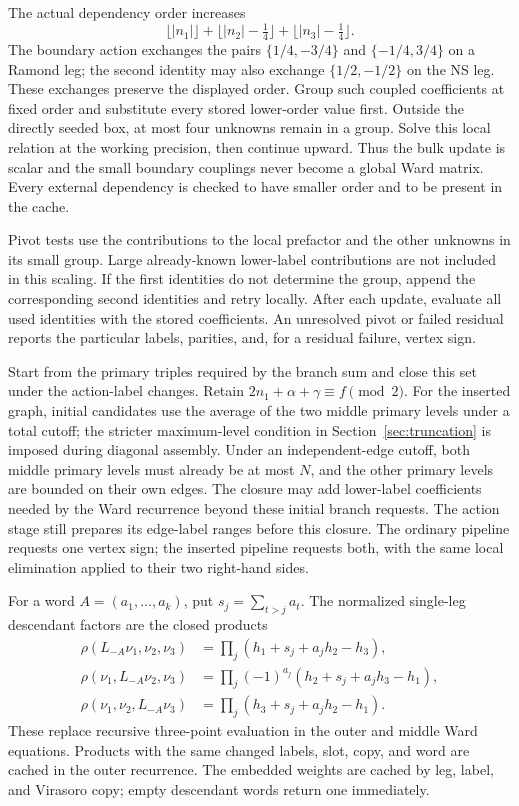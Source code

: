 \documentclass[11pt]{article}
\numberwithin{equation}{section}
\begin{document}
The actual dependency order increases
\begin{equation}
 \lfloor |n_1|\rfloor+\lfloor |n_2|-\tfrac14\rfloor
                         +\lfloor |n_3|-\tfrac14\rfloor.
\end{equation}
The boundary action exchanges the pairs $\{1/4,-3/4\}$ and
$\{-1/4,3/4\}$ on a Ramond leg; the second identity may also exchange
$\{1/2,-1/2\}$ on the NS leg. These exchanges preserve the displayed order.
Group such coupled coefficients at fixed order and substitute every stored
lower-order value first. Outside the directly seeded box, at most four
unknowns remain in a group. Solve this local relation at the working precision,
then continue upward. Thus the bulk update is scalar and the small boundary
couplings never become a global Ward matrix. Every external dependency is
checked to have smaller order and to be present in the cache.

Pivot tests use the contributions to the local prefactor and the other
unknowns in its small group. Large already-known lower-label contributions
are not included in this scaling. If the first identities do not determine
the group, append the corresponding second identities and retry locally.
After each update, evaluate all used identities with the stored coefficients.
An unresolved pivot or failed residual reports the particular labels, parities,
and, for a residual failure, vertex sign.

Start from the primary triples required by the branch sum and close this set
under the action-label changes. Retain
$2n_1+\alpha+\gamma\equiv f\pmod2$. For the inserted graph, initial candidates
use the average of the two middle primary levels under a total cutoff; the
stricter maximum-level condition in Section~\ref{sec:truncation} is imposed
during diagonal assembly. Under an independent-edge cutoff, both middle
primary levels must already be at most $N$, and the other primary levels
are bounded on their own edges. The closure may add lower-label coefficients
needed by the Ward recurrence beyond these initial branch requests.
The action stage still prepares its edge-label ranges before this closure.
The ordinary pipeline requests one vertex sign; the inserted pipeline requests
both, with the same local elimination applied to their two right-hand sides.

For a word $A=(a_1,\ldots,a_k)$, put $s_j=\sum_{t>j}a_t$.
The normalized single-leg descendant factors are the closed products
\begin{align}
 \rho(L_{-A}\nu_1,\nu_2,\nu_3)&=\prod_j(h_1+s_j+a_jh_2-h_3),\\
 \rho(\nu_1,L_{-A}\nu_2,\nu_3)&=\prod_j(-1)^{a_j}(h_2+s_j+a_jh_3-h_1),\\
 \rho(\nu_1,\nu_2,L_{-A}\nu_3)&=\prod_j(h_3+s_j+a_jh_2-h_1).
 \label{eq:single-leg}
\end{align}
These replace recursive three-point evaluation in the outer and middle
Ward equations. Products with the same changed labels, slot, copy, and word
are cached in the outer recurrence. The embedded weights are cached by leg,
label, and Virasoro copy; empty descendant words return one immediately.
\end{document}
